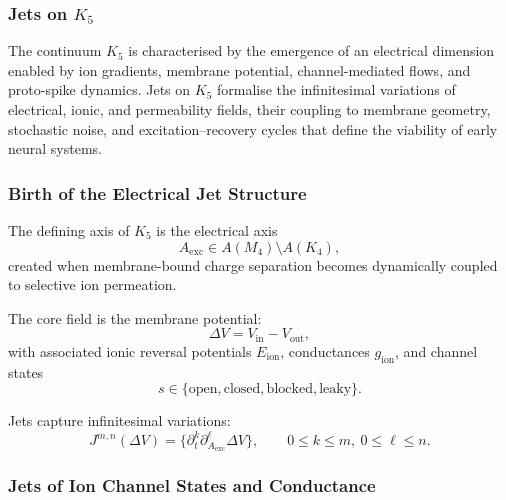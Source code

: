 
\subsubsection{Jets on \texorpdfstring{$K_5$}{K_5}}
\label{sec:jets-k5}

The continuum $K_5$ is characterised by the emergence of an electrical
dimension enabled by ion gradients, membrane potential, channel-mediated
flows, and proto-spike dynamics. Jets on $K_5$ formalise the
infinitesimal variations of electrical, ionic, and permeability fields,
their coupling to membrane geometry, stochastic noise, and
excitation–recovery cycles that define the viability of early neural
systems.


\subsubsection{Birth of the Electrical Jet Structure}

The defining axis of $K_5$ is the electrical axis
\[
A_{\mathrm{exc}} \in A(M_4)\setminus A(K_4),
\]
created when membrane-bound charge separation becomes dynamically
coupled to selective ion permeation.

The core field is the membrane potential:
\[
\Delta V = V_{\mathrm{in}} - V_{\mathrm{out}},
\]
with associated ionic reversal potentials $E_{\mathrm{ion}}$,
conductances $g_{\mathrm{ion}}$, and channel states
\[
s \in \{\mathrm{open},\mathrm{closed},\mathrm{blocked},\mathrm{leaky}\}.
\]

Jets capture infinitesimal variations:
\[
J^{m,n}(\Delta V)=
\{\partial_t^k\partial_{A_{\mathrm{exc}}}^\ell \Delta V\}, 
\qquad
0 \le k \le m,\ 0\le\ell\le n.
\]


\subsubsection{Jets of Ion Channel States and Conductance}

